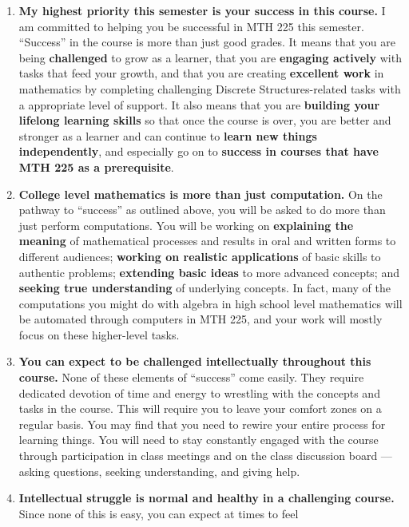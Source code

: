 \documentclass[]{article}
\providecommand{\tightlist}{%
  \setlength{\itemsep}{0pt}\setlength{\parskip}{0pt}}
\begin{document}
\begin{enumerate}
\def\labelenumi{\arabic{enumi}.}
\tightlist
\item
  \textbf{My highest priority this semester is your success in this
  course.} I am committed to helping you be successful in MTH 225 this
  semester. ``Success'' in the course is more than just good grades. It
  means that you are being \textbf{challenged} to grow as a learner,
  that you are \textbf{engaging actively} with tasks that feed your
  growth, and that you are creating \textbf{excellent work} in
  mathematics by completing challenging Discrete Structures-related
  tasks with a appropriate level of support. It also means that you are
  \textbf{building your lifelong learning skills} so that once the
  course is over, you are better and stronger as a learner and can
  continue to \textbf{learn new things independently}, and especially go
  on to \textbf{success in courses that have MTH 225 as a prerequisite}.
\item
  \textbf{College level mathematics is more than just computation.} On
  the pathway to ``success'' as outlined above, you will be asked to do
  more than just perform computations. You will be working on
  \textbf{explaining the meaning} of mathematical processes and results
  in oral and written forms to different audiences; \textbf{working on
  realistic applications} of basic skills to authentic problems;
  \textbf{extending basic ideas} to more advanced concepts; and
  \textbf{seeking true understanding} of underlying concepts. In fact,
  many of the computations you might do with algebra in high school
  level mathematics will be automated through computers in MTH 225, and
  your work will mostly focus on these higher-level tasks.
\item
  \textbf{You can expect to be challenged intellectually throughout this
  course.} None of these elements of ``success'' come easily. They
  require dedicated devotion of time and energy to wrestling with the
  concepts and tasks in the course. This will require you to leave your
  comfort zones on a regular basis. You may find that you need to rewire
  your entire process for learning things. You will need to stay
  constantly engaged with the course through participation in class
  meetings and on the class discussion board --- asking questions,
  seeking understanding, and giving help.\\
\item
  \textbf{Intellectual struggle is normal and healthy in a challenging
  course.} Since none of this is easy, you can expect at times to feel

\end{enumerate}
\end{document}
